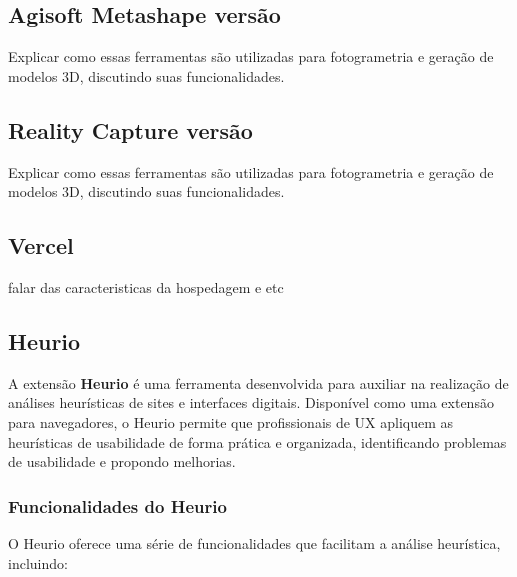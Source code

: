 \subsection{Agisoft Metashape versão}
Explicar como essas ferramentas são utilizadas para fotogrametria e geração de modelos 3D, discutindo suas funcionalidades.

\subsection{Reality Capture versão}
Explicar como essas ferramentas são utilizadas para fotogrametria e geração de modelos 3D, discutindo suas funcionalidades.

\subsection{Vercel}
falar das caracteristicas da hospedagem e etc

\subsection{Heurio}
A extensão \textbf{Heurio} é uma ferramenta desenvolvida para auxiliar na realização de análises heurísticas de sites e interfaces digitais. Disponível como uma extensão para navegadores, o Heurio permite que profissionais de UX apliquem as heurísticas de usabilidade de forma prática e organizada, identificando problemas de usabilidade e propondo melhorias.

\subsubsection{Funcionalidades do Heurio}
O Heurio oferece uma série de funcionalidades que facilitam a análise heurística, incluindo:

